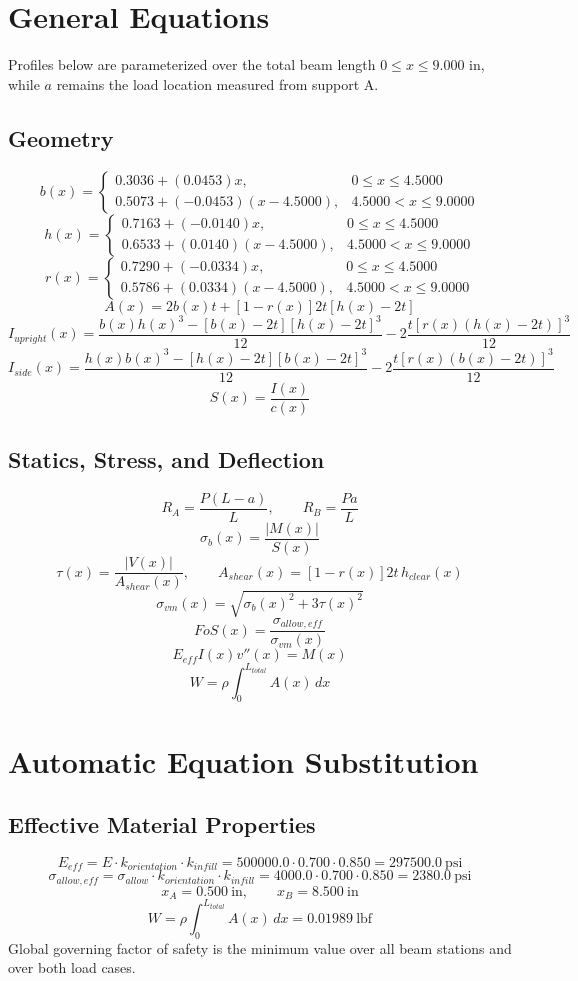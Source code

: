\documentclass[11pt]{article}
\begin{document}
\section*{General Equations}
Profiles below are parameterized over the total beam length $0 \le x \le 9.000$ in, while $a$ remains the load location measured from support A.
\subsection*{Geometry}
\[
b(x)=\begin{cases}0.3036 + (0.0453)x, & 0 \le x \le 4.5000\\0.5073 + (-0.0453)(x-4.5000), & 4.5000 < x \le 9.0000\end{cases}
\]
\[
h(x)=\begin{cases}0.7163 + (-0.0140)x, & 0 \le x \le 4.5000\\0.6533 + (0.0140)(x-4.5000), & 4.5000 < x \le 9.0000\end{cases}
\]
\[
r(x)=\begin{cases}0.7290 + (-0.0334)x, & 0 \le x \le 4.5000\\0.5786 + (0.0334)(x-4.5000), & 4.5000 < x \le 9.0000\end{cases}
\]
\[
A(x)=2b(x)t+[1-r(x)]2t[h(x)-2t]
\]
\[
I_{upright}(x)=\frac{b(x)h(x)^3-[b(x)-2t][h(x)-2t]^3}{12}-2\frac{t[r(x)(h(x)-2t)]^3}{12}
\]
\[
I_{side}(x)=\frac{h(x)b(x)^3-[h(x)-2t][b(x)-2t]^3}{12}-2\frac{t[r(x)(b(x)-2t)]^3}{12}
\]
\[
S(x)=\frac{I(x)}{c(x)}
\]

\subsection*{Statics, Stress, and Deflection}
\[
R_A=\frac{P(L-a)}{L}, \qquad R_B=\frac{Pa}{L}
\]
\[
\sigma_b(x)=\frac{|M(x)|}{S(x)}
\]
\[
\tau(x)=\frac{|V(x)|}{A_{shear}(x)}, \qquad A_{shear}(x)=[1-r(x)]2t\,h_{clear}(x)
\]
\[
\sigma_{vm}(x)=\sqrt{\sigma_b(x)^2+3\tau(x)^2}
\]
\[
FoS(x)=\frac{\sigma_{allow,eff}}{\sigma_{vm}(x)}
\]
\[
E_{eff}I(x)v''(x)=M(x)
\]
\[
W=\rho\int_0^{L_{total}} A(x)\,dx
\]

\section*{Automatic Equation Substitution}
\subsection*{Effective Material Properties}
\[E_{eff} = E \cdot k_{orientation} \cdot k_{infill} = 500000.0 \cdot 0.700 \cdot 0.850 = 297500.0\ \mathrm{psi}\]
\[\sigma_{allow,eff} = \sigma_{allow} \cdot k_{orientation} \cdot k_{infill} = 4000.0 \cdot 0.700 \cdot 0.850 = 2380.0\ \mathrm{psi}\]
\[x_A = 0.500\ \mathrm{in}, \qquad x_B = 8.500\ \mathrm{in}\]
\[W = \rho \int_0^{L_{total}} A(x)\,dx = 0.01989\ \mathrm{lbf}\]
Global governing factor of safety is the minimum value over all beam stations and over both load cases.
\end{document}
